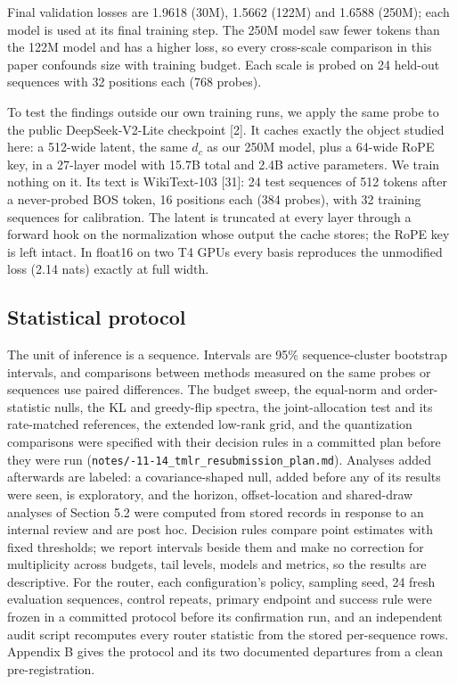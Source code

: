\documentclass[10pt]{article}
\begin{document}
Final validation losses are 1.9618 (30M), 1.5662 (122M) and 1.6588 (250M); each model is used at its final training step. The 250M model saw fewer tokens than the 122M model and has a higher loss, so every cross-scale comparison in this paper confounds size with training budget. Each scale is probed on 24 held-out sequences with 32 positions each (768 probes).

To test the findings outside our own training runs, we apply the same probe to the public DeepSeek-V2-Lite checkpoint [2]. It caches exactly the object studied here: a 512-wide latent, the same $d_c$ as our 250M model, plus a 64-wide RoPE key, in a 27-layer model with 15.7B total and 2.4B active parameters. We train nothing on it. Its text is WikiText-103 [31]: 24 test sequences of 512 tokens after a never-probed BOS token, 16 positions each (384 probes), with 32 training sequences for calibration. The latent is truncated at every layer through a forward hook on the normalization whose output the cache stores; the RoPE key is left intact. In float16 on two T4 GPUs every basis reproduces the unmodified loss (2.14 nats) exactly at full width.

\subsection{Statistical protocol}

The unit of inference is a sequence. Intervals are 95\% sequence-cluster bootstrap intervals, and comparisons between methods measured on the same probes or sequences use paired differences. The budget sweep, the equal-norm and order-statistic nulls, the KL and greedy-flip spectra, the joint-allocation test and its rate-matched references, the extended low-rank grid, and the quantization comparisons were specified with their decision rules in a committed plan before they were run (\texttt{notes/-11-14\_tmlr\_resubmission\_plan.md}). Analyses added afterwards are labeled: a covariance-shaped null, added before any of its results were seen, is exploratory, and the horizon, offset-location and shared-draw analyses of Section 5.2 were computed from stored records in response to an internal review and are post hoc. Decision rules compare point estimates with fixed thresholds; we report intervals beside them and make no correction for multiplicity across budgets, tail levels, models and metrics, so the results are descriptive. For the router, each configuration's policy, sampling seed, 24 fresh evaluation sequences, control repeats, primary endpoint and success rule were frozen in a committed protocol before its confirmation run, and an independent audit script recomputes every router statistic from the stored per-sequence rows. Appendix B gives the protocol and its two documented departures from a clean pre-registration.
\end{document}
